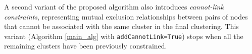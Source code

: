 A second variant of the proposed algorithm also introduces \emph{cannot-link constraints}, representing mutual exclusion relationships between pairs of nodes that cannot be associated with the same cluster in the final clustering. This variant (Algorithm \ref{main_alg} with \texttt{addCannotLink=True}) stops when all the remaining clusters have been previously constrained.

